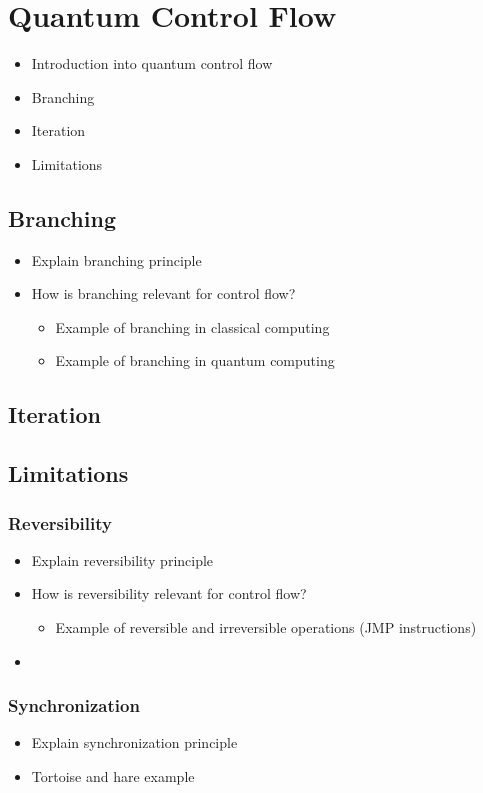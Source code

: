 \section{Quantum Control Flow}
\begin{itemize}
    \item Introduction into quantum control flow
    \item Branching
    \item Iteration
    \item Limitations
\end{itemize}

\subsection{Branching}
\begin{itemize}
    \item Explain branching principle
    \item How is branching relevant for control flow?
    \begin{itemize}
        \item Example of branching in classical computing
        \item Example of branching in quantum computing
    \end{itemize}
\end{itemize}

\subsection{Iteration}

\subsection{Limitations}	

\subsubsection{Reversibility}
\begin{itemize}
    \item Explain reversibility principle
    \item How is reversibility relevant for control flow?
    \begin{itemize}
        \item Example of reversible and irreversible operations (JMP instructions)
    \end{itemize} 
    \item 
\end{itemize}
\subsubsection{Synchronization}
\begin{itemize}
    \item Explain synchronization principle
    \item Tortoise and hare example
\end{itemize}